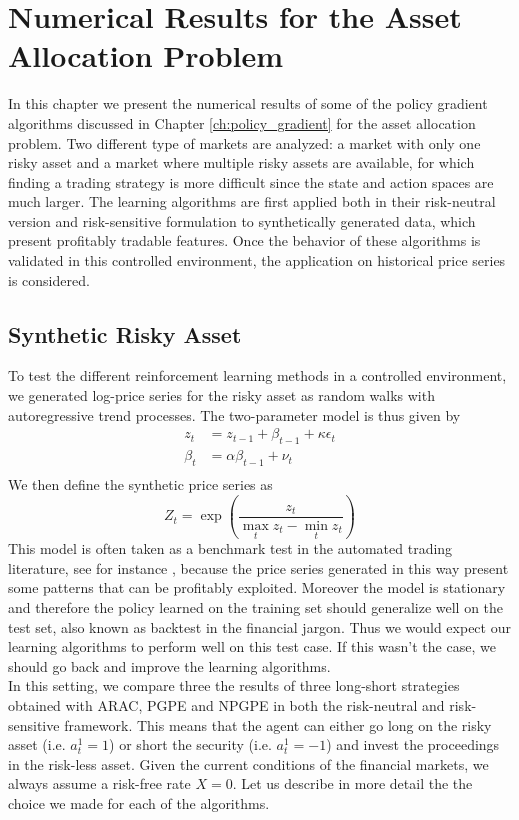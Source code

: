 \chapter{Numerical Results for the Asset Allocation Problem}

In this chapter we present the numerical results of some of the policy gradient algorithms discussed in Chapter \ref{ch:policy_gradient} for the asset allocation problem. Two different type of markets are analyzed: a market with only one risky asset and a market where multiple risky assets are available, for which finding a trading strategy is more difficult since the state and action spaces are much larger. The learning algorithms are first applied both in their risk-neutral version and risk-sensitive formulation to synthetically generated data, which present profitably tradable features. Once the behavior of these algorithms is validated in this controlled environment, the application on historical price series is considered. 

\section{Synthetic Risky Asset}
\label{sec:synthetic_risky_asset}
To test the different reinforcement learning methods in a controlled environment, we generated log-price series for the risky asset as random walks with autoregressive trend processes. The two-parameter model is thus given by
\begin{equation*}
	\begin{split}
		z_t &= z_{t-1} + \beta_{t-1} + \kappa \epsilon_t\\
		\beta_t &= \alpha \beta_{t-1} + \nu_t\\
	\end{split}
\end{equation*}
We then define the synthetic price series as
\begin{equation*}
	Z_t = \exp\left(\frac{z_t}{\max_t z_t - \min_t z_t}\right)
\end{equation*}
This model is often taken as a benchmark test in the automated trading literature, see for instance \cite{moody1998performance}, because the price series generated in this way present some patterns that can be profitably exploited. Moreover the model is stationary and therefore the policy learned on the training set should generalize well on the test set, also known as backtest in the financial jargon. Thus we would expect our learning algorithms to perform well on this test case. If this wasn't the case, we should go back and improve the learning algorithms.\\
In this setting, we compare three the results of three long-short strategies obtained with ARAC, PGPE and NPGPE in both the risk-neutral and risk-sensitive framework. This means that the agent can either go long on the risky asset (i.e. $a_t^1 = 1$) or short the security (i.e. $a_t^1 = -1$) and invest the proceedings in the risk-less asset. Given the current conditions of the financial markets, we always assume a risk-free rate $X = 0$. Let us describe in more detail the the choice we made for each of the algorithms. 

